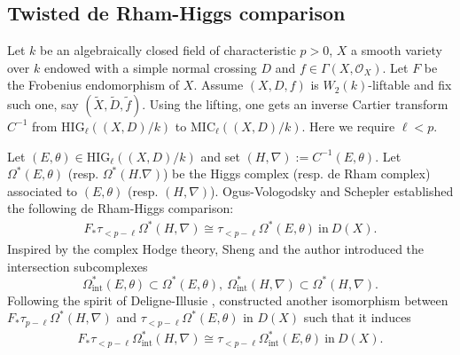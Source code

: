 \documentclass[12pt, a4paper]{article}
\begin{document}
\subsection{Twisted de Rham-Higgs comparison}
Let $k$ be an algebraically closed field of characteristic $p>0$, $X$ a smooth variety over $k$ endowed with a simple normal crossing $D$ and $f\in\Gamma(X,\mathcal O_X)$. Let $F$ be the Frobenius endomorphism of $X$.
Assume $(X,D,f)$ is $W_2(k)$-liftable and fix such one, say $(\tilde X,\tilde D,\tilde f)$. Using the lifting, one gets an inverse Cartier transform $C^{-1}$ from $\mathrm{HIG}_\ell((X,D)/k)$ to $\mathrm{MIC}_\ell((X,D)/k)$. Here we require $\ell<p$.

Let $(E,\theta)\in\mathrm{HIG}_\ell((X,D)/k)$ and set $(H,\nabla):=C^{-1}(E,\theta)$. Let
$\Omega^*(E,\theta)$ (resp. $\Omega^*(H.\nabla)$) be the Higgs complex (resp. de Rham complex) associated to $(E,\theta)$ (resp. $(H,\nabla)$).
Ogus-Vologodsky \cite[Corollary 2.27]{OV} and Schepler \cite[corollary 5.7]{Schepler} established the following de Rham-Higgs comparison:
\begin{eqnarray}\label{OV comparison}
F_*\tau_{<p-\ell}\Omega^*(H,\nabla)\cong\tau_{<p-\ell}\Omega^*(E,\theta)~\mathrm{in}~D(X).
\end{eqnarray}
Inspired by the complex Hodge theory, Sheng and the author \cite[\S2.1]{SZ2} introduced the intersection subcomplexes
$$
\Omega_\mathrm{int}^*(E,\theta)\subset\Omega^*(E,\theta),~\Omega_\mathrm{int}^*(H,\nabla)\subset\Omega^*(H,\nabla).
$$
Following the spirit of Deligne-Illusie \cite{DI}, \cite{SZ2} constructed another isomorphism between $F_*\tau_{p-\ell}\Omega^*(H,\nabla)$ and $\tau_{<p-\ell}\Omega^*(E,\theta)$ in $D(X)$ such that it induces
\begin{eqnarray}\label{SZ comparison}
F_*\tau_{<p-\ell}\Omega_\mathrm{int}^*(H,\nabla)\cong\tau_{<p-\ell}\Omega_\mathrm{int}^*(E,\theta)~\mathrm{in}~D(X).
\end{eqnarray}
\end{document}
